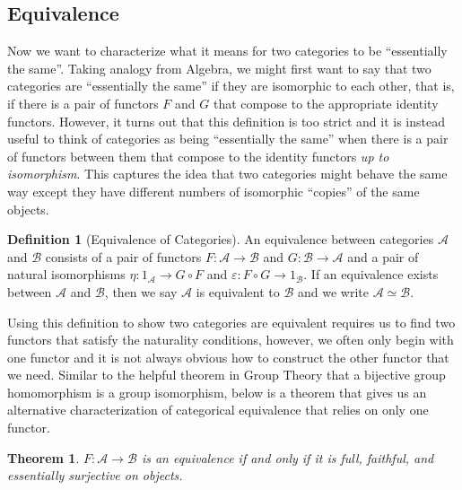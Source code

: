 \documentclass[11pt]{article}
\theoremstyle{definition}
\newtheorem*{defn}{Definition}
\theoremstyle{plain}
\newtheorem{theo}{Theorem}
\theoremstyle{plain}
\theoremstyle{plain}
\begin{document}
\subsection*{Equivalence}

Now we want to characterize what it means for two categories to be ``essentially the same''. Taking analogy from Algebra, we might first want to say that two categories are ``essentially the same'' if they are isomorphic to each other, that is, if there is a pair of functors $F$ and $G$ that compose to the appropriate identity functors. However, it turns out that this definition is too strict and it is instead useful to think of categories as being ``essentially the same'' when there is a pair of functors between them that compose to the identity functors \emph{up to isomorphism}. This captures the idea that two categories might behave the same way except they have different numbers of isomorphic ``copies'' of the same objects.

\begin{defn}[Equivalence of Categories]
An equivalence between categories $\mathscr{A}$ and $\mathscr{B}$ consists of a pair of functors $F:\mathscr{A}\to\mathscr{B}$ and $G:\mathscr{B}\to\mathscr{A}$ and a pair of natural isomorphisms $\eta:1_{\mathscr{A}} \to G\circ F$ and $\varepsilon: F\circ G \to 1_{\mathscr{B}}$. If an equivalence exists between $\mathscr{A}$ and $\mathscr{B}$, then we say $\mathscr{A}$ is equivalent to $\mathscr{B}$ and we write $\mathscr{A}\simeq\mathscr{B}$.
\end{defn}

Using this definition to show two categories are equivalent requires us to find two functors that satisfy the naturality conditions, however, we often only begin with one functor and it is not always obvious how to construct the other functor that we need. Similar to the helpful theorem in Group Theory that a bijective group homomorphism is a group isomorphism, below is a theorem that gives us an alternative characterization of categorical equivalence that relies on only one functor.

\begin{theo}
$F:\mathscr{A}\to\mathscr{B}$ is an equivalence if and only if it is full, faithful, and essentially surjective on objects.
\end{theo}
\end{document}
